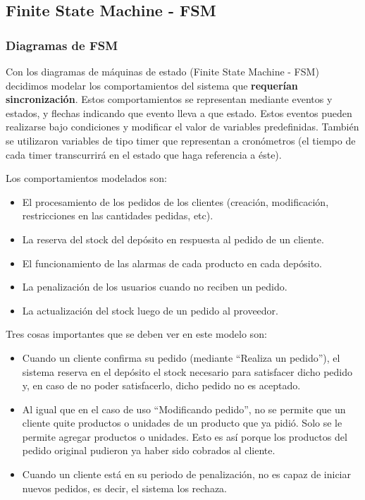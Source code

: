 \subsection{Finite State Machine - FSM}

\subsubsection{Diagramas de FSM}

Con los diagramas de máquinas de estado (Finite State Machine - FSM) decidimos modelar los comportamientos del sistema que \textbf{requerían sincronización}. Estos comportamientos se representan mediante eventos y estados, y flechas indicando que evento lleva a que estado. Estos eventos pueden realizarse bajo condiciones y modificar el valor de variables predefinidas. También se utilizaron variables de tipo timer que representan a cronómetros (el tiempo de cada timer transcurrirá en el estado que haga referencia a éste). 


Los comportamientos modelados son:
\begin{itemize}
\item El procesamiento de los pedidos de los clientes (creación, modificación, restricciones en las cantidades pedidas, etc).
\item La reserva del stock del depósito en respuesta al pedido de un cliente.
\item El funcionamiento de las alarmas de cada producto en cada depósito.
\item La penalización de los usuarios cuando no reciben un pedido.
\item La actualización del stock luego de un pedido al proveedor.
\end{itemize}


Tres cosas importantes que se deben ver en este modelo son:
\begin{itemize}
\item Cuando un cliente confirma su pedido (mediante ``Realiza un pedido''), el sistema reserva en el depósito el stock necesario para satisfacer dicho pedido y, en caso de no poder satisfacerlo, dicho pedido no es aceptado.
\item Al igual que en el caso de uso ``Modificando pedido'', no se permite que un cliente quite productos o unidades de un producto que ya pidió. Solo se le permite agregar productos o unidades. Esto es así porque los productos del pedido original pudieron ya haber sido cobrados al cliente.
\item Cuando un cliente está en su periodo de penalización, no es capaz de iniciar nuevos pedidos, es decir, el sistema los rechaza.
\end{itemize}

